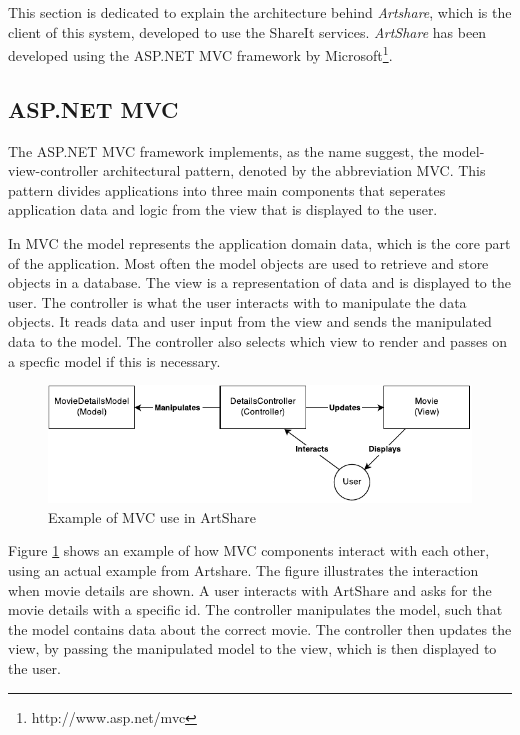 \documentclass[../report.tex]{subfiles}
\begin{document}
\graphicspath{{img/}{../img/}}

This section is dedicated to explain the architecture behind \textit{Artshare}, which is the client of this system, developed to use the ShareIt services. \textit{ArtShare} has been developed using the ASP.NET MVC framework by Microsoft\footnote{http://www.asp.net/mvc}. 


\subsection{ASP.NET MVC}

The ASP.NET MVC framework implements, as the name suggest, the model-view-controller architectural pattern, denoted by the abbreviation MVC. This pattern divides applications into three main components that seperates application data and logic from the view that is displayed to the user. 

In MVC the model represents the application domain data, which is the core part of the application. Most often the model objects are used to retrieve and store objects in a database. The view is a representation of data and is displayed to the user. The controller is what the user interacts with to manipulate the data objects. It reads data and user input from the view and sends the manipulated data to the model. The controller also selects which view to render and passes on a specfic model if this is necessary.

\begin{figure}[H]
\includegraphics[width=\linewidth]{mvc.pdf}
\caption{Example of MVC use in ArtShare}
\label{fig:mvc}
\end{figure}

Figure \ref{fig:mvc} shows an example of how MVC components interact with each other, using an actual example from Artshare. The figure illustrates the interaction when movie details are shown. A user interacts with ArtShare and asks for the movie details with a specific id. The controller manipulates the model, such that the model contains data about the correct movie. The controller then updates the view, by passing the manipulated model to the view, which is then displayed to the user.
\end{document}
